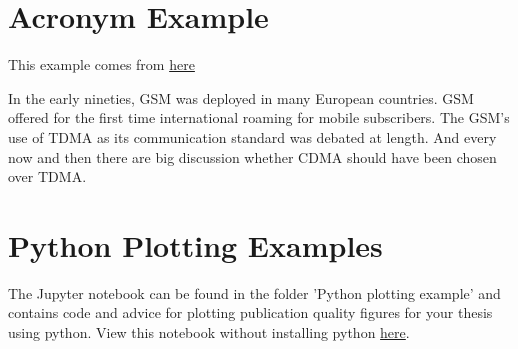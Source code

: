 \section{Acronym Example}\label{sec:acro_example}

This example comes from \href{https://mirror.aarnet.edu.au/pub/CTAN/macros/latex/contrib/acronym/acronym.pdf}{here}

In the early nineties, \acs{GSM} was deployed in many European countries. \ac{GSM} offered for the first time international roaming for mobile subscribers. The \acs{GSM}’s use of \ac{TDMA} as its communication standard was debated at length. And every now and then there are big discussion whether \ac{CDMA} should have been chosen over \ac{TDMA}.

\section{Python Plotting Examples}

The Jupyter notebook can be found in the folder 'Python plotting example' and contains code and advice for plotting publication quality figures for your thesis using python. View this notebook without installing python \href{https://nbviewer.jupyter.org/github/blairium/ltu-thesis/blob/97c95023caed8c8055ad905a8f68ad73061df8ad/Python_plotting_example/Plotting_Example.ipynb}{here}.



